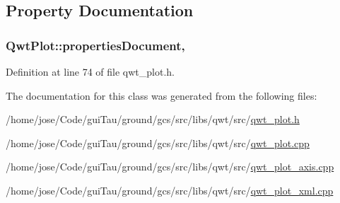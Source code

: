 \subsection{Property Documentation}
\hypertarget{class_qwt_plot_a1f27a18e9f3c562fb6410ce40cdd3569}{
\subsubsection[{properties\-Document}]{ Qwt\-Plot\-::properties\-Document\hspace{0.3cm}{\ttfamily [read]}, {\ttfamily [write]}}}\label{class_qwt_plot_a1f27a18e9f3c562fb6410ce40cdd3569}


Definition at line 74 of file qwt\-\_\-plot.\-h.



The documentation for this class was generated from the following files\-:\begin{DoxyCompactItemize}
\item 
/home/jose/\-Code/gui\-Tau/ground/gcs/src/libs/qwt/src/\hyperlink{qwt__plot_8h}{qwt\-\_\-plot.\-h}\item 
/home/jose/\-Code/gui\-Tau/ground/gcs/src/libs/qwt/src/\hyperlink{qwt__plot_8cpp}{qwt\-\_\-plot.\-cpp}\item 
/home/jose/\-Code/gui\-Tau/ground/gcs/src/libs/qwt/src/\hyperlink{qwt__plot__axis_8cpp}{qwt\-\_\-plot\-\_\-axis.\-cpp}\item 
/home/jose/\-Code/gui\-Tau/ground/gcs/src/libs/qwt/src/\hyperlink{qwt__plot__xml_8cpp}{qwt\-\_\-plot\-\_\-xml.\-cpp}\end{DoxyCompactItemize}
